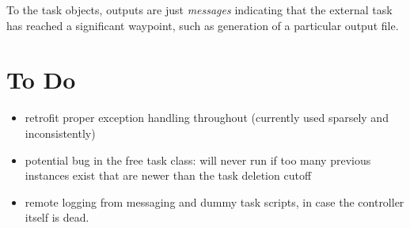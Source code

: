 \documentclass[11pt,a4paper]{article}
\begin{document}
To the task objects, outputs are just {\em messages} indicating that the
external task has reached a significant waypoint, such as generation of
a particular output file.

\section{To Do}

\begin{itemize}

\item
 retrofit proper exception handling throughout (currently used sparsely and 
  inconsistently)

\item
 potential bug in the free task class: will never run if too many
 previous instances exist that are newer than the task deletion cutoff

\item
 remote logging from messaging and dummy task scripts, in case the
 controller itself is dead.

\end{itemize}
\end{document}
